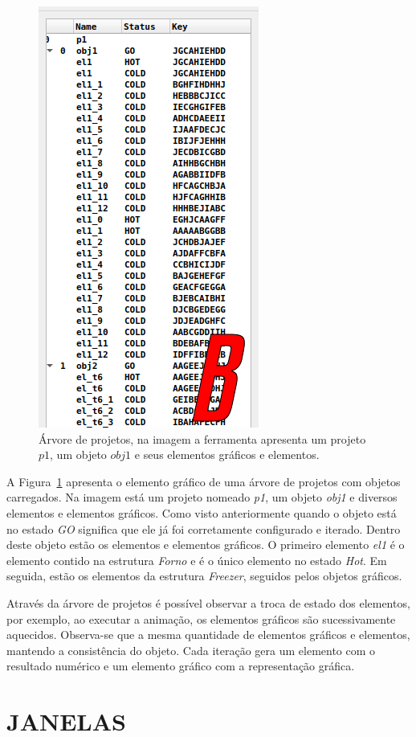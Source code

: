 \begin{figure}[!htbp]
	\centering
	\includegraphics[width=0.4\linewidth]{Figures/IGU_001c.png}
	\caption{Árvore de projetos, na imagem a ferramenta apresenta um projeto $p1$, um objeto $obj1$ e seus elementos gráficos e elementos.}
	\label{fig:arvores}
\end{figure}

A Figura~\ref{fig:arvores} apresenta o elemento gráfico de uma árvore de projetos com objetos carregados. Na imagem está um projeto nomeado \textit{p1}, um objeto \textit{obj1} e diversos elementos e elementos gráficos. Como visto anteriormente quando o objeto está no estado \textit{GO} significa que ele já foi corretamente configurado e iterado. Dentro deste objeto estão os elementos e elementos gráficos. O primeiro elemento \textit{el1} é o elemento contido na estrutura \textit{Forno} e é o único elemento no estado \textit{Hot}. Em seguida, estão os elementos da estrutura \textit{Freezer}, seguidos pelos objetos gráficos.

Através da árvore de projetos é possível observar a troca de estado dos elementos, por exemplo, ao executar a animação, os elementos gráficos são sucessivamente aquecidos. Observa-se que a mesma quantidade de elementos gráficos e elementos, mantendo a consistência do objeto. Cada iteração gera um elemento com o resultado numérico e um elemento gráfico com a representação gráfica.

\section{JANELAS}\label{sec:janelas}


